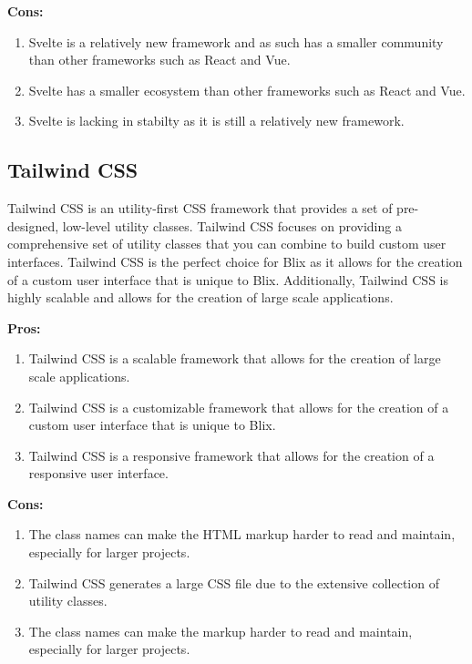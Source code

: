 \documentclass[11pt,a4paper]{article}
\begin{document}
\textbf{Cons:}
\begin{enumerate}[label*=\arabic*.]
	\item[\textbullet] Svelte is a relatively new framework and as such has a smaller community than other frameworks such as React and Vue.
	\item[\textbullet] Svelte has a smaller ecosystem than other frameworks such as React and Vue.
	\item[\textbullet] Svelte is lacking in stabilty as it is still a relatively new framework.
\end{enumerate}

\subsection{Tailwind CSS}
Tailwind CSS is an utility-first CSS framework that provides a set of pre-designed, low-level utility classes. Tailwind CSS focuses on providing a comprehensive set of utility classes that you can combine to build custom user interfaces.
Tailwind CSS is the perfect choice for Blix as it allows for the creation of a custom user interface that is unique to Blix. 
Additionally, Tailwind CSS is highly scalable and allows for the creation of large scale applications.

\textbf{Pros:}
\begin{enumerate}[label*=\arabic*.]
	\item[\textbullet] Tailwind CSS is a scalable framework that allows for the creation of large scale applications.
	\item[\textbullet] Tailwind CSS is a customizable framework that allows for the creation of a custom user interface that is unique to Blix.
	\item[\textbullet] Tailwind CSS is a responsive framework that allows for the creation of a responsive user interface.
\end{enumerate}

\textbf{Cons:}
\begin{enumerate}[label*=\arabic*.]
	\item[\textbullet] The class names can make the HTML markup harder to read and maintain, especially for larger projects.
	\item[\textbullet] Tailwind CSS generates a large CSS file due to the extensive collection of utility classes. 
	\item[\textbullet] The class names can make the markup harder to read and maintain, especially for larger projects.
\end{enumerate}
\end{document}
